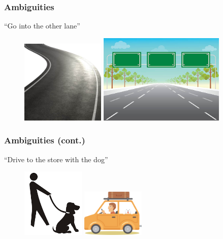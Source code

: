 \documentclass{beamer}
\begin{document}
\begin{frame}
\frametitle{Ambiguities}

\begin{center}
\begin{minipage}{4cm}
\begin{alertblock}{}
``Go into the other lane''
\end{alertblock}
\end{minipage}
\end{center}
\pause
\begin{figure}
\hspace*{-3mm}%
\centering
   \includegraphics[width=4cm]{pics/singleLane.jpg}
   \pause
   \includegraphics[width=6cm]{pics/multipleLane.jpg}
\end{figure}
  
\end{frame}

\begin{frame}

\frametitle{Ambiguities (cont.)}

\begin{alertblock}{}
``Drive to the store with the dog''
\end{alertblock}
\pause
\begin{figure}
\hspace*{-3mm}%
\centering
   \includegraphics[width=3cm]{pics/personDog.png}
   \pause
   \includegraphics[width=3cm]{pics/dogCar.png}
\end{figure}
  
\end{frame}
\end{document}
